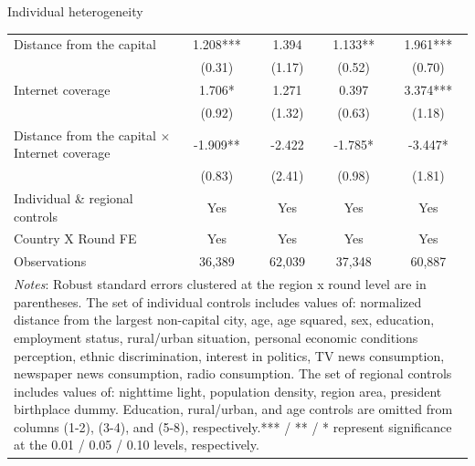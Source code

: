 \documentclass[10pt]{beamer}
\begin{document}
\begin{frame}{Individual heterogeneity}
\begin{table}[H]
{\begin{tabular}{@{\extracolsep{5pt}} l c c c c}
         Distance from the capital&       1.208***&       1.394   &       1.133** &       1.961*** \\
         \smallskip
         &      (0.31)   &      (1.17)   &      (0.52)   &      (0.70)  \\
         Internet coverage  &       1.706*  &       1.271   &       0.397   &       3.374***\\
         \smallskip
         &      (0.92)   &      (1.32)   &      (0.63)   &      (1.18)   \\
           Distance from the capital $\times$ Internet coverage&      -1.909** &      -2.422   &      -1.785*  &      -3.447* \\
           \medskip
           &      (0.83)   &      (2.41)   &      (0.98)   &      (1.81)    \\
         \midrule
         \smallskip
        Individual \& regional controls  & Yes & Yes & Yes & Yes\\
        \smallskip
        Country X Round FE       & Yes& Yes & Yes& Yes\\
        \smallskip
        Observations         &       36,389   &       62,039   &       37,348   &       60,887\\
        \bottomrule
        \multicolumn{5}{p{15cm}}{\footnotesize \emph{Notes}: Robust standard errors clustered at the region x round level are in parentheses. The set of individual controls
        includes values of: normalized distance from the largest non-capital city, age, age squared, sex,
        education, employment status, rural/urban situation, personal economic conditions perception, ethnic discrimination, interest in politics, TV news consumption, newspaper news consumption, radio consumption. The set of regional controls includes values of: nighttime light, population density, region area, president birthplace dummy. Education, rural/urban, and age controls are omitted from columns (1-2), (3-4), and (5-8), respectively.*** / ** / * represent significance at the 0.01 / 0.05 / 0.10 levels, respectively.}
        \end{tabular}
        }
        \end{table}
\end{frame}
\end{document}
